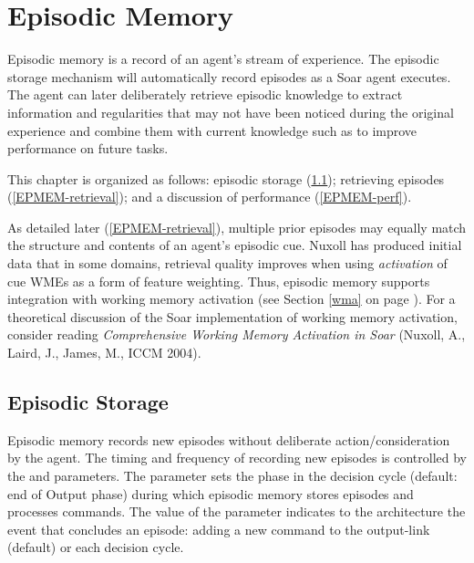 \chapter{Episodic Memory}
\label{EPMEM}

Episodic memory is a record of an agent's stream of experience. The episodic storage mechanism will automatically record episodes as a Soar agent executes. The agent can later deliberately retrieve episodic knowledge to extract information and regularities that may not have been noticed during the original experience and combine them with current knowledge such as to improve performance on future tasks.

This chapter is organized as follows: episodic storage (\ref{EPMEM-storage}); retrieving episodes (\ref{EPMEM-retrieval}); and a discussion of performance (\ref{EPMEM-perf}).

%
As detailed later (\ref{EPMEM-retrieval}), multiple prior episodes may equally match the structure and contents of an agent's episodic cue.  Nuxoll has produced initial data that in some domains, retrieval quality improves when using \emph{activation} of cue WMEs as a form of feature weighting.  Thus, episodic memory supports integration with working memory activation (see Section \ref{wma} on page \pageref{wma}).  For a theoretical discussion of the Soar implementation of working memory activation, consider reading \emph{Comprehensive Working Memory Activation in Soar} (Nuxoll, A., Laird, J., James, M., ICCM 2004).

\section{Episodic Storage}
\label{EPMEM-storage}

Episodic memory records new episodes without deliberate action/consideration by the agent. The timing and frequency of recording new episodes is controlled by the  and  parameters.  The  parameter sets the phase in the decision cycle (default: end of Output phase) during which episodic memory stores episodes and processes commands.  The value of the  parameter indicates to the architecture the event that concludes an episode: adding a new command to the output-link (default) or each decision cycle.

